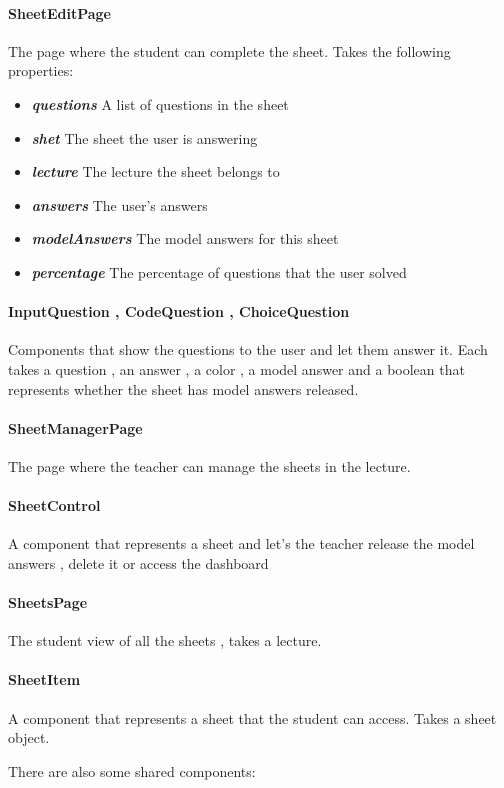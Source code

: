 \paragraph{SheetEditPage} The page where the student can complete the sheet. Takes the following properties:
\begin{itemize}
	\item \textit{\textbf{questions}} A list of questions in the sheet
	\item \textit{\textbf{shet}} The sheet the user is answering
	\item \textit{\textbf{lecture}} The lecture the sheet belongs to
	\item \textit{\textbf{answers}} The user's answers
	\item \textit{\textbf{modelAnswers}} The model answers for this sheet
	\item \textit{\textbf{percentage}} The percentage of questions that the user solved
\end{itemize}
\paragraph{InputQuestion , CodeQuestion , ChoiceQuestion} Components that show the questions to the user and let them answer it. Each takes a question , an answer , a color , a model answer and a boolean that represents whether the sheet has model answers released.
\paragraph{SheetManagerPage} The page where the teacher can manage the sheets in the lecture.
\paragraph{SheetControl} A component that represents a sheet and let's the teacher release the model answers , delete it or access the dashboard
\paragraph{SheetsPage} The student view of all the sheets , takes a lecture.
\paragraph{SheetItem} A component that represents a sheet that the student can access. Takes a sheet object.

There are also some shared components:

